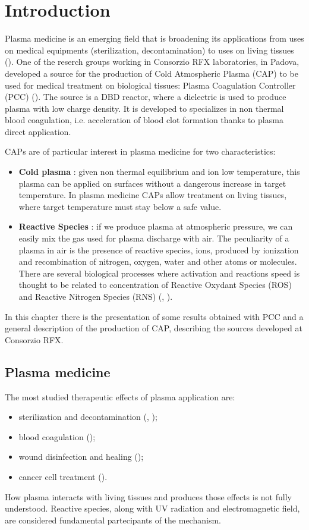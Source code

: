 \chapter{Introduction}
\label{ch:intro}
Plasma medicine is an emerging field that is broadening its applications from uses on medical equipments (sterilization, decontamination) to uses on living tissues (\cite{plmed_review}). One of the reserch groups working in Consorzio RFX laboratories, in Padova, developed a source for the production of Cold Atmospheric Plasma (CAP) to be used for medical treatment on biological tissues: Plasma Coagulation Controller (PCC) (\cite{DeMasi_2018}). The source is a DBD reactor, where a dielectric is used to produce plasma with low charge density. It is developed to specializes in non thermal blood coagulation, i.e. acceleration of blood clot formation thanks to plasma direct application.

CAPs are of particular interest in plasma medicine for two characteristics:
\begin{itemize}
 \item \textbf{Cold plasma} : given non thermal equilibrium and ion low temperature, this plasma can be applied on surfaces without a dangerous increase in target temperature. In plasma medicine CAPs allow treatment on living tissues, where target temperature must stay below a safe value.
 \item \textbf{Reactive Species} : if we produce plasma at atmospheric pressure, we can easily mix the gas used for plasma discharge with air. The peculiarity of a plasma in air is the presence of reactive species, ions, produced by ionization and recombination of nitrogen, oxygen, water and other atoms or molecules. There are several biological processes where activation and reactions speed is thought to be related to concentration of Reactive Oxydant Species (ROS) and Reactive Nitrogen Species (RNS) (\cite{doi:10.1152/ajplung.2000.279.6.L1005}, \cite{doi:10.1152/ajpcell.00366.2006}). 
\end{itemize}

In this chapter there is the presentation of some results obtained with PCC and a general description of the production of CAP, describing the sources developed at Consorzio RFX.

\section{Plasma medicine}
The most studied therapeutic effects of plasma application are:
\begin{itemize}
 \item sterilization and decontamination (\cite{Martines_2009}, \cite{Stoffels_2007});
 \item blood coagulation (\cite{Fridman2006});
 \item wound disinfection and healing (\cite{Haertel2014});
 \item cancer cell treatment (\cite{Yan2016}).
\end{itemize}
How plasma interacts with living tissues and produces those effects is not fully understood. Reactive species, along with UV radiation and electromagnetic field, are considered fundamental partecipants of the mechanism.

